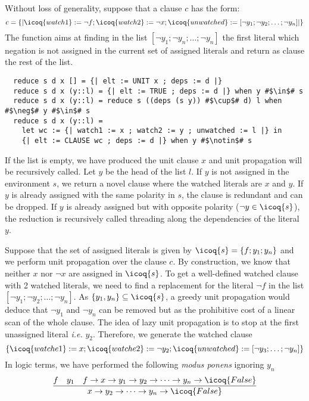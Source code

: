 \documentclass[utf8,a4paper,UKenglish,cleveref, autoref, thm-restate]{lipics-v2019}
\begin{document}
Without loss of generality, suppose that a clause $c$ has the form:
\[
  c = \{| \icoq{watch1} := \neg f ; \icoq{watch2} := \neg x ; \icoq{unwatched} := [\neg y_1;\neg y_2;\dots;\neg y_n]|\}
\]
The  function aims at finding in the list
$[\neg y_1;\neg y_n;\dots;\neg y_n]$ the first literal which negation is not assigned in the
current set of assigned literals  and return as clause the
rest of the
list. %
\begin{verbatim}
  reduce s d x [] = {| elt := UNIT x ; deps := d |}
  reduce s d x (y::l) = {| elt := TRUE ; deps := d |} when y #$\in$# s
  reduce s d x (y::l) = reduce s ((deps (s y)) #$\cup$# d) l when #$\neg$# y #$\in$# s
  reduce s d x (y::l) =
    let wc := {| watch1 := x ; watch2 := y ; unwatched := l |} in
    {| elt := CLAUSE wc ; deps := d |} when y #$\notin$# s
\end{verbatim}
If the list is empty, we have produced the unit clause $x$ and unit
propagation will be recursively called.  Let $y$ be the head of the list
$l$.  If $y$ is not assigned in the environment $s$, we return a
novel clause where the watched literals are $x$ and $y$.
%
If $y$ is already assigned with the same polarity in $s$, the clause
is redundant and can be dropped.  If $y$ is already assigned but with
opposite polarity ($\neg y \in \icoq{s}$), the reduction is recursively called threading along
the dependencies of the literal $y$.
%
\begin{example}
  Suppose that the set of assigned literals is given by
  $\icoq{s} = \{ f; y_1; y_n \}$ and we perform unit
  propagation over the clause $c$.  By construction, we know that
  neither $x$ nor $\neg x$ are assigned in $\icoq{s}$. To get a
  well-defined watched clause with 2 watched literals, we need to find
  a replacement for the literal $\neg f$ in the list
  $[\neg y_1;\neg y_2;\ldots;\neg y_n]$.
  As $\{y_1, y_n\} \subseteq  \icoq{s}$, a greedy unit propagation would deduce that
  $\neg y_1$ and $\neg y_n$ can be removed but as the prohibitive cost of a linear scan of the whole clause.
  The idea of lazy unit propagation is to stop at the first unassigned literal \emph{i.e.} $y_2$.
  Therefore, we generate the watched clause
  \[
    \{ \icoq{watche1} := x ; \icoq{watche2} := \neg y_2 ; \icoq{unwatched} := [\neg y_3;\dots;\neg y_n] \}
    \]
    In logic terms, we have performed the following \emph{modus ponens} ignoring $y_n$
    \[
      \dfrac{
        f \quad y_1 \quad f \to x \to y_1 \to y_2 \to \dots  \to y_n \to \icoq{False}
      }
      {  x \to y_2 \to \dots \to y_n \to \icoq{False} }
    \]
\end{example}
\end{document}
